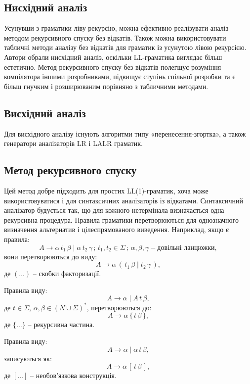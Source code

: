\documentclass{memoir}
\begin{document}
\subsection{Нисхідний аналіз}
Усунувши з граматики ліву рекурсію, можна ефективно реалізувати аналіз методом рекурсивного спуску без відкатів. Також можна використовувати табличні методи аналізу без відкатів для граматик із усунутою лівою рекурсією. Автори обрали нисхідний аналіз, оскільки LL-граматика виглядає більш естетично. Метод рекурсивного спуску без відкатів полегшує розуміння компілятора іншими розробниками, підвищує ступінь спільної розробки та є більш гнучким і розширюваним порівняно з табличними методами.

\subsection{Висхідний аналіз}
Для висхідного аналізу існують алгоритми типу «перенесення-згортка», а також генератори аналізаторів LR і LALR граматик.

\subsection{Метод рекурсивного спуску}
Цей метод добре підходить для простих LL(1)-граматик, хоча може використовуватися і для синтаксичних аналізаторів із відкатами. Синтаксичний аналізатор будується так, що для кожного нетермінала визначається одна рекурсивна процедура. Правила граматики перетворюються для однозначного визначення альтернатив і цілеспрямованого виведення. Наприклад, якщо є правила:
\[
A \to \alpha \, t_1 \, \beta \mid \alpha \, t_2 \, \gamma \, ; \, t_1, t_2 \in \Sigma \, ; \, \alpha, \beta, \gamma - \text{довільні ланцюжки},
\]
вони перетворюються до виду:
\[
A \to \alpha \, ( \, t_1 \, \beta \mid t_2 \, \gamma \, ),
\]
де \( ( \dots ) \) – скобки факторизації.

Правила виду:
\[
A \to \alpha \mid A \, t \, \beta,
\]
де \( t \in \Sigma \), \( \alpha, \beta \in (N \cup \Sigma)^* \), перетворюються до:
\[
A \to \alpha \, \{ \, t \, \beta \, \},
\]
де \( \{ \dots \} \) – рекурсивна частина.

Правила виду:
\[
A \to \alpha \mid \alpha \, t \, \beta,
\]
записуються як:
\[
A \to \alpha \, [ \, t \, \beta \, ],
\]
де \( [ \dots ] \) – необов’язкова конструкція.
\end{document}
